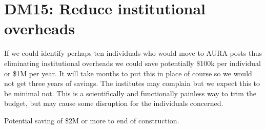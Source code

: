 \section{DM15: Reduce institutional overheads}\label{sect:dm15}

If we could identify perhaps ten individuals who would move to AURA posts thus eliminating institutional overheads we could save potentially \$100k per individual or \$1M per year.
It will take months to put this in place of course so we would not get three years of savings.
The institutes may complain but we expect this to be minimal not.
This is a scientifically and functionally painless way to trim the budget, but may cause some disruption for the individuals concerned.

Potential saving of \$2M  or more to end of construction.



